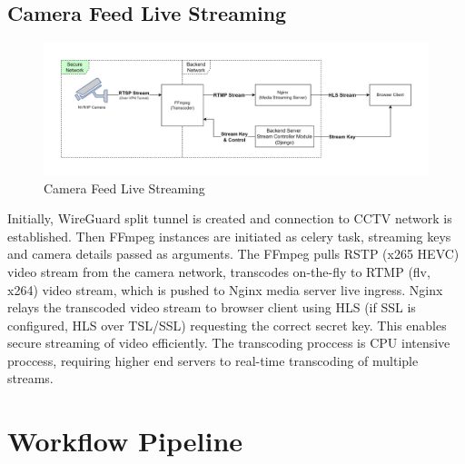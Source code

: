 	


\subsection{Camera Feed Live Streaming}
\begin{figure}[ht!]
	\centering
	\includegraphics[width=0.8\linewidth]{Images/live_stream_arch}
	\caption{Camera Feed Live Streaming}
	\label{fig:livestreamarch}
\end{figure}
Initially, WireGuard split tunnel is created and connection to CCTV network is established. Then FFmpeg instances are initiated as celery task, streaming keys and camera details passed as arguments. The FFmpeg pulls RSTP (x265 HEVC) video stream from the camera network, transcodes on-the-fly to RTMP (flv, x264) video stream, which is pushed to Nginx media server live ingress. Nginx relays the transcoded video stream to browser client using HLS (if SSL is configured, HLS over TSL/SSL) requesting the correct secret key. This enables secure streaming of video efficiently. The transcoding proccess is CPU intensive proccess, requiring higher end servers to real-time transcoding of multiple streams.

\section{Workflow Pipeline}


